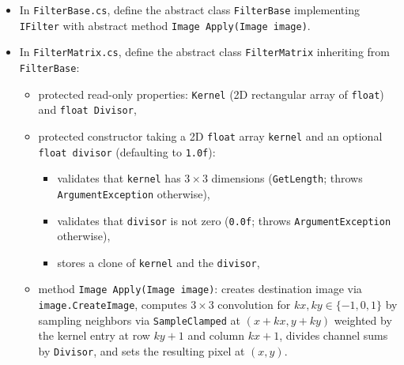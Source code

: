 \documentclass[11pt,a4paper,addpoints]{exam}
\begin{document}
\begin{questions}
\begin{itemize}
    \item In \texttt{FilterBase.cs}, define the abstract class \texttt{FilterBase} implementing \texttt{IFilter} with abstract method \texttt{Image Apply(Image image)}.

    \item In \texttt{FilterMatrix.cs}, define the abstract class \texttt{FilterMatrix} inheriting from \texttt{FilterBase}:
    \begin{itemize}
        \item protected read-only properties: \texttt{Kernel} (2D rectangular array of \texttt{float}) and \texttt{float Divisor},
        \item protected constructor taking a 2D \texttt{float} array \texttt{kernel} and an optional \texttt{float divisor} (defaulting to \texttt{1.0f}):
        \begin{itemize}
            \item validates that \texttt{kernel} has $3 \times 3$ dimensions (\texttt{GetLength}; throws \texttt{ArgumentException} otherwise),
            \item validates that \texttt{divisor} is not zero (\texttt{0.0f}; throws \texttt{ArgumentException} otherwise),
            \item stores a clone of \texttt{kernel} and the \texttt{divisor},
        \end{itemize}
        \item method \texttt{Image Apply(Image image)}: creates destination image via \texttt{image.CreateImage}, computes $3 \times 3$ convolution for $kx, ky \in \{-1, 0, 1\}$ by sampling neighbors via \texttt{SampleClamped} at $(x + kx, y + ky)$ weighted by the kernel entry at row $ky + 1$ and column $kx + 1$, divides channel sums by \texttt{Divisor}, and sets the resulting pixel at $(x, y)$.
    \end{itemize}


\end{itemize}
\end{questions}
\end{document}
